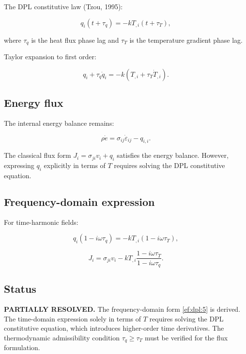 The DPL constitutive law (Tzou, 1995):

\begin{equation}
q_i(t + \tau_q) = -k T_{,i}(t + \tau_T),
\label{ef:dpl:1}
\end{equation}

where $\tau_q$ is the heat flux phase lag and $\tau_T$ is the temperature gradient phase lag.

Taylor expansion to first order:

\begin{equation}
q_i + \tau_q\dot{q}_i = -k(T_{,i} + \tau_T\dot{T}_{,i}).
\label{ef:dpl:2}
\end{equation}

\subsection{Energy flux}

The internal energy balance remains:

\begin{equation}
\rho\dot{e} = \sigma_{ij}\dot{\varepsilon}_{ij} - q_{i,i}.
\label{ef:dpl:3}
\end{equation}

The classical flux form $J_i = \sigma_{ji}v_i + q_i$ satisfies the energy balance. However, expressing $q_i$ explicitly in terms of $T$ requires solving the DPL constitutive equation.

\subsection{Frequency-domain expression}

For time-harmonic fields:

\begin{equation}
q_i(1 - i\omega\tau_q) = -k T_{,i}(1 - i\omega\tau_T),
\label{ef:dpl:4}
\end{equation}

\begin{equation}
J_i = \sigma_{ji}v_i - k T_{,i}\frac{1 - i\omega\tau_T}{1 - i\omega\tau_q}.
\label{ef:dpl:5}
\end{equation}

\subsection{Status}

\textbf{PARTIALLY RESOLVED.} The frequency-domain form \eqref{ef:dpl:5} is derived. The time-domain expression solely in terms of $T$ requires solving the DPL constitutive equation, which introduces higher-order time derivatives. The thermodynamic admissibility condition $\tau_q \geq \tau_T$ must be verified for the flux formulation.

